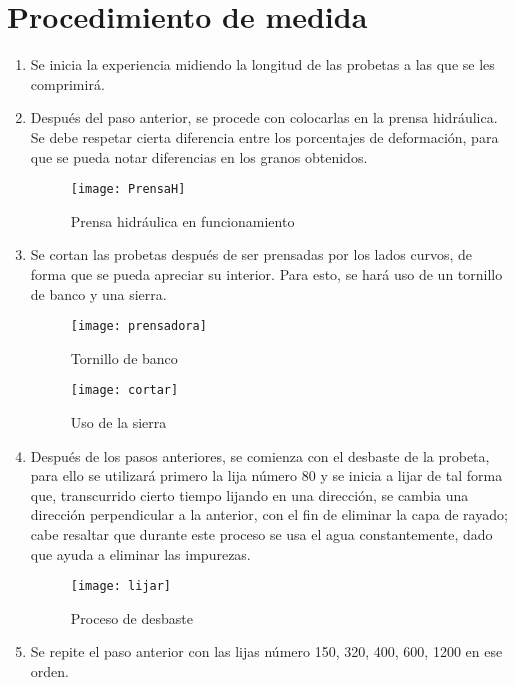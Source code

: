 \documentclass[a4paper,12pt]{report}
\begin{document}
\chapter{Procedimiento de medida}
\begin{enumerate}
\item Se inicia la experiencia midiendo la longitud de las probetas a las que se les comprimirá.
\item Después del paso anterior, se procede con colocarlas en la prensa hidráulica. Se debe respetar cierta diferencia entre los porcentajes de deformación, para que se pueda notar diferencias en los granos obtenidos.
\begin{figure}[H]
\begin{center}
\texttt{[image: PrensaH]}
\end{center}
\caption[Prensa hidráulica]{Prensa hidráulica en funcionamiento}
\end{figure}
\newpage
\item Se cortan las probetas después de ser prensadas por los lados curvos, de forma que se pueda apreciar su interior. Para esto, se hará uso de un tornillo de banco y una sierra.
\begin{figure}[H]
\begin{center}
\texttt{[image: prensadora]}
\end{center}
\caption{Tornillo de banco}
\end{figure}
\begin{figure}[H]
\begin{center}
\texttt{[image: cortar]}
\end{center}
\caption{Uso de la sierra}
\end{figure}
\item Después de los pasos anteriores, se comienza con el desbaste de la probeta, para ello se utilizará primero la lija número 80 y se inicia a lijar de tal forma que, transcurrido cierto tiempo lijando en una dirección, se cambia una dirección perpendicular a la anterior, con el fin de eliminar la capa de rayado; cabe resaltar que durante este proceso se usa el agua constantemente, dado que ayuda a eliminar las impurezas.
\begin{figure}[H]
\begin{center}
\texttt{[image: lijar]}
\end{center}
\caption{Proceso de desbaste}
\end{figure}
\item Se repite el paso anterior con las lijas número 150, 320, 400, 600, 1200 en ese orden.

\end{enumerate}
\end{document}
